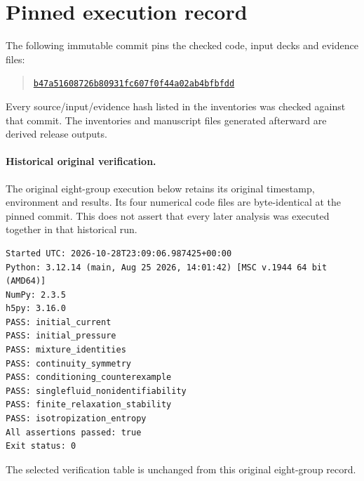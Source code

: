 \section{Pinned execution record}
\label{app:execution}
The following immutable commit pins the checked code, input decks and evidence files:
\begin{quote}\small
\href{https://github.com/Teylersf/counterstreaming-heatflux-audit/tree/b47a51608726b80931fc607f0f44a02ab4bfbfdd}{\texttt{b47a51608726b80931fc607f0f44a02ab4bfbfdd}}
\end{quote}
Every source/input/evidence hash listed in the inventories was checked against that commit. The inventories and manuscript files generated afterward are derived release outputs.
\paragraph{Historical original verification.}
The original eight-group execution below retains its original timestamp, environment and results. Its four numerical code files are byte-identical at the pinned commit. This does not assert that every later analysis was executed together in that historical run.
\begin{verbatim}
Started UTC: 2026-10-28T23:09:06.987425+00:00
Python: 3.12.14 (main, Aug 25 2026, 14:01:42) [MSC v.1944 64 bit (AMD64)]
NumPy: 2.3.5
h5py: 3.16.0
PASS: initial_current
PASS: initial_pressure
PASS: mixture_identities
PASS: continuity_symmetry
PASS: conditioning_counterexample
PASS: singlefluid_nonidentifiability
PASS: finite_relaxation_stability
PASS: isotropization_entropy
All assertions passed: true
Exit status: 0
\end{verbatim}
The selected verification table is unchanged from this original eight-group record.
